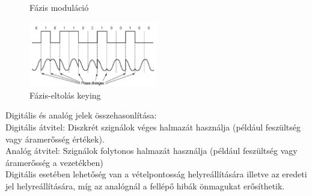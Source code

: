 \documentclass[margin=0px]{article}
\begin{document}
\begin{description}
\begin{itemize}
\begin{itemize}
\begin{figure}[H]
									\caption{Fázis moduláció}
								\end{figure}
								\begin{figure}[H]
									\centering
									\includegraphics[width=0.5\textwidth]{img/fazis_key.png}
									\caption{Fázis-eltolás keying}	
								\end{figure}
						\end{itemize}
						
						Digitális és analóg jelek összehasonlítása: \\
						Digitális átvitel: Diszkrét szignálok véges halmazát
						használja (például feszültség vagy áramerősség
						értékek).\\
						Analóg átvitel: Szignálok folytonos halmazát használja
						(például feszültség vagy áramerősség a vezetékben) \\
						Digitális esetében lehetőség van a vételpontosság helyreállítására illetve az eredeti jel helyreállítására, míg az analógnál a fellépő hibák önmagukat erősíthetik.
				\end{itemize}
		\end{description}
\end{document}
